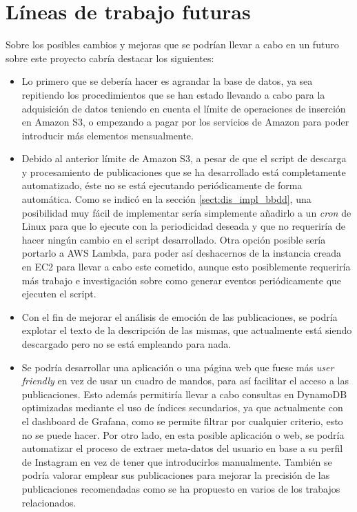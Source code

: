 \section{Líneas de trabajo futuras}

Sobre los posibles cambios y mejoras que se podrían llevar a cabo en un futuro sobre este proyecto cabría destacar los siguientes:

\begin{itemize}
    \item Lo primero que se debería hacer es agrandar la base de datos, ya sea repitiendo los procedimientos que se han estado llevando a cabo para la adquisición de datos teniendo en cuenta el límite de operaciones de inserción en Amazon S3, o empezando a pagar por los servicios de Amazon para poder introducir más elementos mensualmente.
    \item Debido al anterior límite de Amazon S3, a pesar de que el script de descarga y procesamiento de publicaciones que se ha desarrollado está completamente automatizado, éste no se está ejecutando periódicamente de forma automática. Como se indicó en la sección \ref{sect:dis_impl_bbdd}, una posibilidad muy fácil de implementar sería simplemente añadirlo a un \textit{cron} de Linux para que lo ejecute con la periodicidad deseada y que no requeriría de hacer ningún cambio en el script desarrollado. Otra opción posible sería portarlo a AWS Lambda, para poder así deshacernos de la instancia creada en EC2 para llevar a cabo este cometido, aunque esto posiblemente requeriría más trabajo e investigación sobre como generar eventos periódicamente que ejecuten el script.
    \item Con el fin de mejorar el análisis de emoción de las publicaciones, se podría explotar el texto de la descripción de las mismas, que actualmente está siendo descargado pero no se está empleando para nada.
    \item Se podría desarrollar una aplicación o una página web que fuese más \textit{user friendly} en vez de usar un cuadro de mandos, para así facilitar el acceso a las publicaciones. Esto además permitiría llevar a cabo consultas en DynamoDB optimizadas mediante el uso de índices secundarios, ya que actualmente con el dashboard de Grafana, como se permite filtrar por cualquier criterio, esto no se puede hacer. Por otro lado, en esta posible aplicación o web, se podría automatizar el proceso de extraer meta-datos del usuario en base a su perfil de Instagram en vez de tener que introducirlos manualmente. También se podría valorar emplear sus publicaciones para mejorar la precisión de las publicaciones recomendadas como se ha propuesto en varios de los trabajos relacionados.
\end{itemize}
